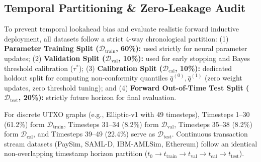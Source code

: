 \begin{table}[t]
\centering
\caption{Structural Overview of the 14 Benchmark Financial Networks (Complete 14-dataset itemization in Supplementary Table~S3).}
\label{tab:dataset_corpus}
\renewcommand{\arraystretch}{0.84}
\end{table}

\subsection{Temporal Partitioning \& Zero-Leakage Audit}
\label{sec:temporal_partitioning}
To prevent temporal lookahead bias and evaluate realistic forward inductive deployment, all datasets follow a strict 4-way chronological partition: (1) \textbf{Parameter Training Split ($\mathcal{D}_{\text{train}}$, 60\%):} used strictly for neural parameter updates; (2) \textbf{Validation Split ($\mathcal{D}_{\text{val}}$, 10\%):} used for early stopping and Bayes threshold calibration ($\tau^*$); (3) \textbf{Calibration Split ($\mathcal{D}_{\text{cal}}$, 10\%):} dedicated holdout split for computing non-conformity quantiles $\hat{q}^{(0)}, \hat{q}^{(1)}$ (zero weight updates, zero threshold tuning); and (4) \textbf{Forward Out-of-Time Test Split ($\mathcal{D}_{\text{test}}$, 20\%):} strictly future horizon for final evaluation.

For discrete UTXO graphs (e.g., Elliptic-v1 with 49 timesteps), Timesteps 1--30 (61.2\%) form $\mathcal{D}_{\text{train}}$, Timesteps 31--34 (8.2\%) form $\mathcal{D}_{\text{val}}$, Timesteps 35--38 (8.2\%) form $\mathcal{D}_{\text{cal}}$, and Timesteps 39--49 (22.4\%) serve as $\mathcal{D}_{\text{test}}$. Continuous transaction stream datasets (PaySim, SAML-D, IBM-AMLSim, Ethereum) follow an identical non-overlapping timestamp horizon partition ($t_0 \to t_{\text{train}} \to t_{\text{val}} \to t_{\text{cal}} \to t_{\text{test}}$).

